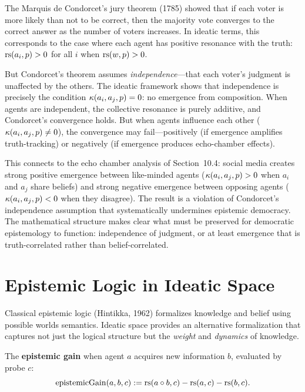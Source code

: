 \begin{remark}
The Marquis de Condorcet's jury theorem (1785) showed that if each voter is more
likely than not to be correct, then the majority vote converges to the correct
answer as the number of voters increases. In ideatic terms, this corresponds to
the case where each agent has positive resonance with the truth:
$\mathrm{rs}(a_i, p) > 0$ for all $i$ when $\mathrm{rs}(w, p) > 0$.

But Condorcet's theorem assumes \emph{independence}---that each voter's judgment
is unaffected by the others. The ideatic framework shows that independence is
precisely the condition $\kappa(a_i, a_j, p) = 0$: no emergence from composition.
When agents are independent, the collective resonance is purely additive, and
Condorcet's convergence holds. But when agents influence each other
($\kappa(a_i, a_j, p) \neq 0$), the convergence may fail---positively (if
emergence amplifies truth-tracking) or negatively (if emergence produces
echo-chamber effects).

This connects to the echo chamber analysis of Section~10.4: social media
creates strong positive emergence between like-minded agents ($\kappa(a_i, a_j, p) > 0$
when $a_i$ and $a_j$ share beliefs) and strong negative emergence between
opposing agents ($\kappa(a_i, a_j, p) < 0$ when they disagree). The result is
a violation of Condorcet's independence assumption that systematically
undermines epistemic democracy. The mathematical structure makes clear what
must be preserved for democratic epistemology to function: independence of judgment,
or at least emergence that is truth-correlated rather than belief-correlated.
\end{remark}


\section{Epistemic Logic in Ideatic Space}

Classical epistemic logic (Hintikka, 1962) formalizes knowledge and belief using
possible worlds semantics. Ideatic space provides an alternative formalization that
captures not just the logical structure but the \emph{weight} and \emph{dynamics}
of knowledge.

\begin{definition}
\label{def:epistemic-gain}
The \textbf{epistemic gain} when agent $a$ acquires new information $b$,
evaluated by probe $c$:
\[
  \mathrm{epistemicGain}(a, b, c) := \mathrm{rs}(a \circ b, c) - \mathrm{rs}(a, c) - \mathrm{rs}(b, c).
\]
\end{definition}

